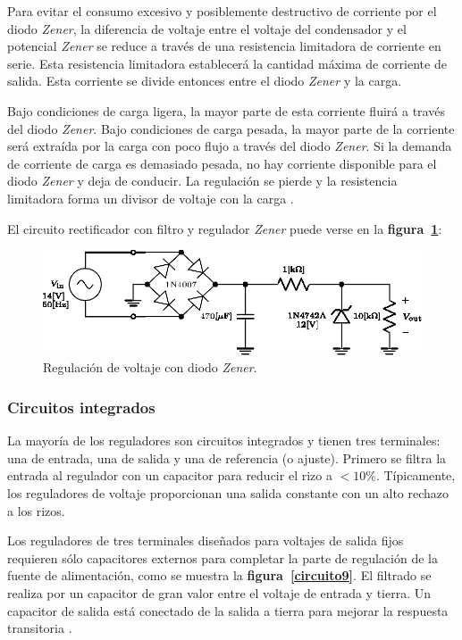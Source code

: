 \documentclass[letter,twoside,11pt]{article}
\begin{document}
Para evitar el consumo excesivo y posiblemente destructivo de corriente por el
diodo \emph{Zener}, la diferencia de voltaje entre el voltaje del condensador y
el potencial \emph{Zener} se reduce a través de una resistencia limitadora de
corriente en serie. Esta resistencia limitadora establecerá la cantidad máxima
de corriente de salida. Esta corriente se divide entonces entre el diodo
\emph{Zener} y la carga.

Bajo condiciones de carga ligera, la mayor parte de esta corriente fluirá a
través del diodo \emph{Zener}. Bajo condiciones de carga pesada, la mayor parte
de la corriente será extraída por la carga con poco flujo a través del diodo
\emph{Zener}. Si la demanda de corriente de carga es demasiado pesada, no hay
corriente disponible para el diodo \emph{Zener} y deja de conducir. La
regulación se pierde y la resistencia limitadora forma un divisor de voltaje con
la carga \cite{Fiore}.

El circuito rectificador con filtro y regulador \emph{Zener} puede verse en la
\textbf{figura~\ref{circuito8}}:

\begin{figure}[!h]
\centering
\includegraphics[scale=1.25]{08.regulador1.eps}
\caption{Regulación de voltaje con diodo \emph{Zener}.}
\label{circuito8}
\end{figure}

\subsubsection{Circuitos integrados}
La mayoría de los reguladores son circuitos integrados y tienen tres terminales:
una de entrada, una de salida y una de referencia (o ajuste). Primero se filtra
la entrada al regulador con un capacitor para reducir el rizo a $<10\%$.
Típicamente, los reguladores de voltaje proporcionan una salida constante con un
alto rechazo a los rizos.

Los reguladores de tres terminales diseñados para voltajes de salida fijos
requieren sólo capacitores externos para completar la parte de regulación de la
fuente de alimentación, como se muestra la \textbf{figura~\ref{circuito9}}. El
filtrado se realiza por un capacitor de gran valor entre el voltaje de entrada y
tierra. Un capacitor de salida está conectado de la salida a tierra para mejorar
la respuesta transitoria \cite{Floyd}.
\end{document}
